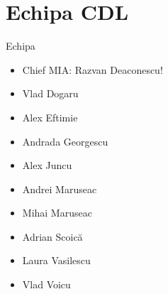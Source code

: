\documentclass{beamer}
\begin{document}
\section {Echipa CDL}
\begin{frame} Echipa
  \begin{itemize}
  \pause
  \item Chief MIA: Razvan Deaconescu!
  \pause 
  \item Vlad Dogaru
  \item Alex Eftimie
  \item Andrada Georgescu
  \item Alex Juncu
  \item Andrei Maruseac
  \item Mihai Maruseac
  \item Adrian Scoică
  \item Laura Vasilescu
  \item Vlad Voicu
  \pause
  \end{itemize}
\end{frame}
\end{document}
